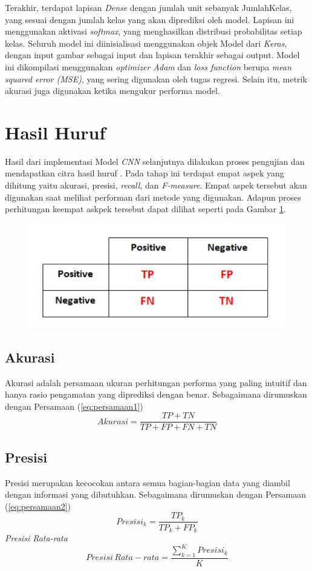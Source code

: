 Terakhir, terdapat lapisan \textit{Dense} dengan jumlah unit sebanyak JumlahKelas, yang sesuai dengan jumlah kelas yang akan diprediksi oleh model. Lapisan ini menggunakan aktivasi \textit{softmax}, yang menghasilkan distribusi probabilitas setiap kelas. Seluruh model ini diinisialisasi menggunakan objek Model dari \textit{Keras}, dengan input gambar sebagai input dan lapisan terakhir sebagai output. Model ini dikompilasi menggunakan \textit{optimizer Adam} dan \textit{loss function} berupa\textit{ mean squared error (MSE)}, yang sering digunakan oleh tugas regresi. Selain itu, metrik akurasi juga digunakan ketika mengukur performa model.

\section{Hasil Huruf}
Hasil dari implementasi Model \textit{CNN} selanjutnya dilakukan proses pengujian dan mendapatkan citra hasil huruf . Pada tahap ini terdapat empat aspek yang dihitung yaitu akurasi, presisi, \textit{recall}, dan \emph {F-measure}. Empat aspek tersebut akan digunakan saat melihat performan dari metode yang digunakan. Adapun proses perhitungan keempat askpek tersebut dapat dilihat seperti pada Gambar \ref{fig:MATRIKSKONFUSI}.
\begin{figure}[hbt!]
	\centering
	\includegraphics[width=0.7\linewidth]{gambar/bener/Nilai-Konfusi-Matriks.png}
	\label{fig:MATRIKSKONFUSI}
\end{figure}

\subsection{Akurasi}
Akurasi adalah persamaan ukuran perhitungan performa yang paling intuitif dan hanya rasio pengamatan yang diprediksi dengan benar. Sebagaimana dirumuskan dengan Persamaan (\ref{eq:persamaan1})
\begin{equation}\label{eq:persamaan1}
Akurasi=\frac{TP+TN}{TP+FP+FN+TN}
\end{equation}
\subsection{Presisi}
Presisi merupakan kecocokan antara semua bagian-bagian data yang diambil dengan informasi yang dibutuhkan. Sebagaimana dirumuskan dengan Persamaan (\ref{eq:persamaan2})
\begin{equation}\label{eq:persamaan2}
Presisi_k=\frac{TP_k}{TP_k+FP_k}
\end{equation} 
{\it Presisi Rata-rata}
\begin{equation}\label{eq:persamaan3}
Presisi \, Rata-rata=\frac{\sum_{k=1}^K Presisi_k}{K}
\end{equation} 
